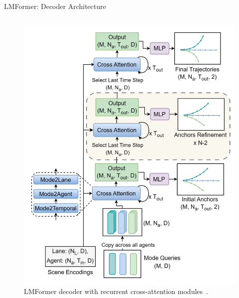 \documentclass[10pt,aspectratio=169]{beamer}
\begin{document}
\begin{frame}{LMFormer: Decoder Architecture}
\begin{columns}[T]
\begin{column}{0.5\textwidth}
\begin{figure}
                \includegraphics[width=\textwidth, height=0.7\textheight, keepaspectratio]{docs/figures/lmformer_arch_decoder.png}
                \caption{LMFormer decoder with recurrent cross-attention modules~\cite{lmformerYadav2025}.}
            \end{figure}
        \end{column}
    \end{columns}
\end{frame}
\end{document}
